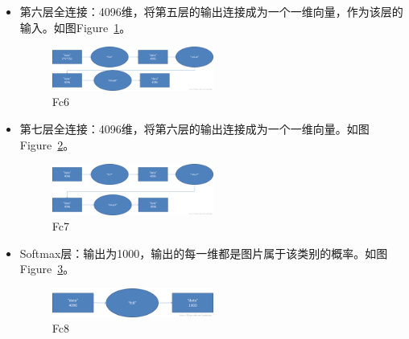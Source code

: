 \documentclass[12pt]{article}
\begin{document}
\begin{itemize}
\item 第六层全连接：4096维，将第五层的输出连接成为一个一维向量，作为该层的输入。如图Figure~\ref{fig:fc6}。
	\begin{figure}[!ht]
	\centering
	\includegraphics[width=0.5\textwidth]{fc1}
	\caption{Fc6}
	\label{fig:fc6}
	\end{figure}
\item 第七层全连接：4096维，将第六层的输出连接成为一个一维向量。如图Figure~\ref{fig:fc7}。
	\begin{figure}[!ht]
	\centering
	\includegraphics[width=0.5\textwidth]{fc2}
	\caption{Fc7}
	\label{fig:fc7}
	\end{figure}
\item Softmax层：输出为1000，输出的每一维都是图片属于该类别的概率。如图Figure~\ref{fig:fc8}。
	\begin{figure}[!ht]
	\centering
	\includegraphics[width=0.5\textwidth]{fc3}
	\caption{Fc8}
	\label{fig:fc8}
	\end{figure}
\end{itemize}




\end{document}
